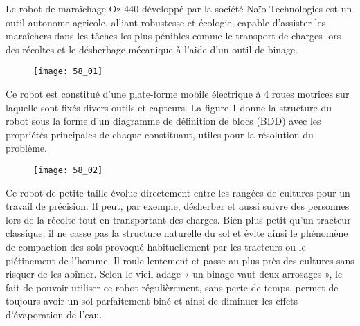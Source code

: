 \normaltrue \difficilefalse \tdifficilefalse
\correctiontrue

\setcounter{question}{0}

\ifcorrection
\else
{}
\fi

\ifprof
\else

Le robot de maraîchage Oz 440 développé par la société Naïo Technologies est un outil autonome
agricole, alliant robustesse et écologie, capable d’assister les maraîchers dans les tâches les plus
pénibles comme le transport de charges lors des récoltes et le désherbage mécanique à l’aide d’un
outil de binage.


\begin{figure}[H]
\centering
\texttt{[image: 58\_01]}
\end{figure}


Ce robot est constitué d’une plate-forme mobile électrique à 4 roues motrices sur laquelle sont
fixés divers outils et capteurs. La figure 1 donne la structure du robot sous la forme d’un
diagramme de définition de blocs (BDD) avec les propriétés principales de chaque constituant,
utiles pour la résolution du problème.

\begin{figure}[H]
\centering
\texttt{[image: 58\_02]}
\end{figure}


Ce robot de petite taille évolue directement entre les rangées de cultures pour un travail de
précision. Il peut, par exemple, désherber et aussi suivre des personnes lors de la récolte tout en
transportant des charges. Bien plus petit qu’un tracteur classique, il ne casse pas la structure
naturelle du sol et évite ainsi le phénomène de compaction des sols provoqué habituellement par les
tracteurs ou le piétinement de l’homme. Il roule lentement et passe au plus près des cultures sans
risquer de les abîmer. Selon le vieil adage « un binage vaut deux arrosages », le fait de pouvoir
utiliser ce robot régulièrement, sans perte de temps, permet de toujours avoir un sol parfaitement
biné et ainsi de diminuer les effets d’évaporation de l’eau.
\fi

